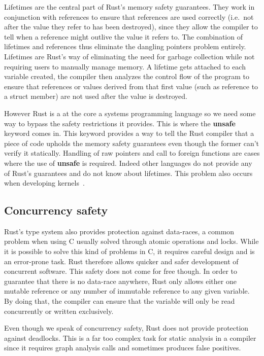 \documentclass[11pt]{article}
\begin{document}
Lifetimes are the central part of Rust's memory safety
guarantees. They work in conjunction with references to ensure
that references are used correctly (i.e.\ not after the value they
refer to has been destroyed), since they allow the compiler to tell
when a reference might outlive the value it refers to. The combination
of lifetimes and references thus eliminate the dangling pointers
problem entirely. Lifetimes are Rust's way of eliminating the need for
garbage collection while not requiring users to manually manage
memory. A lifetime gets attached to each variable created, the
compiler then analyzes the control flow of the program to ensure that
references or values derived from that first value (such as reference
to a struct member) are not used after the value is destroyed.

However Rust is a at the core a systems programming language so we
need some way to bypass the safety restrictions it provides. This is
where the \textbf{unsafe}~\cite{rustonomicon} keyword comes in. This
keyword provides a way to tell the Rust compiler that a piece of code
upholds the memory safety guarantees even though the former can't
verify it statically. Handling of raw pointers and call to foreign
functions are cases where the use of \textbf{unsafe} is
required. Indeed other languages do not provide any of Rust's
guarantees and do not know about lifetimes. This problem also occurs
when developing kernels~\cite{redox}.

\subsection{Concurrency safety}

Rust's type system also provides protection against data-races, a
common problem when using C usually solved through atomic operations
and locks. While it is possible to solve this kind of problems in C,
it requires careful design and is an error-prone task. Rust therefore
allows quicker and safer development of concurrent software. This safety
does not come for free though. In order to guarantee that there is no
data-race anywhere, Rust only allows either one mutable reference or
any number of immutable reference to any given variable. By doing
that, the compiler can ensure that the variable will only be read
concurrently or written exclusively.

Even though we speak of concurrency safety, Rust does not provide
protection against deadlocks. This is a far too complex task for
static analysis in a compiler since it requires graph analysis calls
and sometimes produces false positives.
\end{document}
